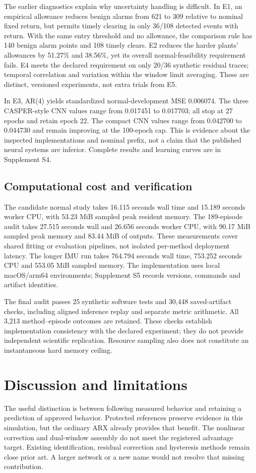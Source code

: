 \documentclass[11pt]{article}
\begin{document}
The earlier diagnostics explain why uncertainty handling is difficult. In E1, an empirical allowance reduces benign alarms from 621 to 309 relative to nominal fixed return, but permits timely clearing in only 36/108 detected events with return. With the same entry threshold and no allowance, the comparison rule has 140 benign alarm points and 108 timely clears. E2 reduces the harder plants' allowances by 51.27\% and 38.56\%, yet its overall normal-feasibility requirement fails. E4 meets the declared requirement on only 20/36 synthetic residual traces; temporal correlation and variation within the window limit averaging. These are distinct, versioned experiments, not extra trials from E5.

In E3, AR(4) yields standardized normal-development MSE 0.006074. The three CASPER-style CNN values range from 0.017451 to 0.017703; all stop at 27 epochs and retain epoch 22. The compact CNN values range from 0.042700 to 0.044730 and remain improving at the 100-epoch cap. This is evidence about the inspected implementations and nominal prefix, not a claim that the published neural systems are inferior. Complete results and learning curves are in Supplement S4.

\subsection{Computational cost and verification}
The candidate normal study takes 16.115 seconds wall time and 15.189 seconds worker CPU, with 53.23 MiB sampled peak resident memory. The 189-episode audit takes 27.515 seconds wall and 26.656 seconds worker CPU, with 90.17 MiB sampled peak memory and 83.44 MiB of outputs. These measurements cover shared fitting or evaluation pipelines, not isolated per-method deployment latency. The longer IMU run takes 764.794 seconds wall time, 753.252 seconds CPU and 553.05 MiB sampled memory. The implementation uses local macOS/arm64 environments; Supplement S5 records versions, commands and artifact identities.

The final audit passes 25 synthetic software tests and 30,448 saved-artifact checks, including aligned inference replay and separate metric arithmetic. All 3,213 method--episode outcomes are retained. These checks establish implementation consistency with the declared experiment; they do not provide independent scientific replication. Resource sampling also does not constitute an instantaneous hard memory ceiling.

\section{Discussion and limitations}
The useful distinction is between following measured behavior and retaining a prediction of approved behavior. Protected references preserve evidence in this simulation, but the ordinary ARX already provides that benefit. The nonlinear correction and dual-window assembly do not meet the registered advantage target. Existing identification, residual correction and hysteresis methods remain close prior art. A larger network or a new name would not resolve that missing contribution.
\end{document}

